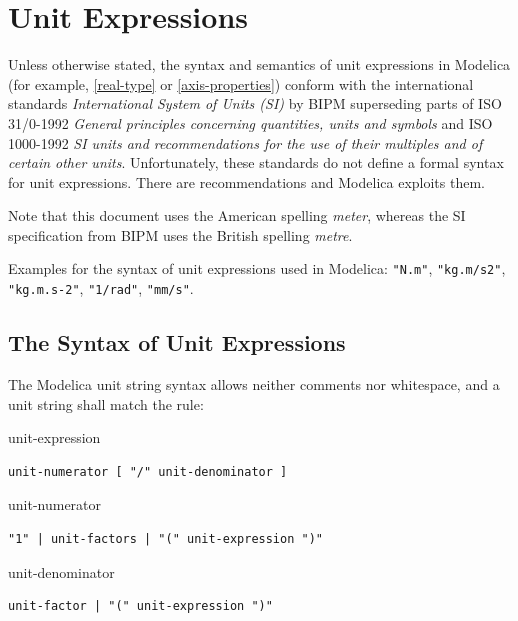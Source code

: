 \chapter{Unit Expressions}\label{unit-expressions}

Unless otherwise stated, the syntax and semantics of unit expressions in Modelica (for example, \cref{real-type} or \cref{axis-properties}) conform with the international standards \emph{International System of Units (SI)} by BIPM superseding parts of ISO 31/0-1992 \emph{General principles concerning quantities, units and symbols} and ISO 1000-1992 \emph{SI units and recommendations for the use of their multiples and of certain other units}.
Unfortunately, these standards do not define a formal syntax for unit expressions.
There are recommendations and Modelica exploits them.

Note that this document uses the American spelling \emph{meter}, whereas the SI specification from BIPM uses the British spelling \emph{metre}.

Examples for the syntax of unit expressions used in Modelica: \lstinline!"N.m"!, \lstinline!"kg.m/s2"!, \lstinline!"kg.m.s-2"!, \lstinline!"1/rad"!, \lstinline!"mm/s"!.

\section{The Syntax of Unit Expressions}\label{the-syntax-of-unit-expressions}

The Modelica unit string syntax allows neither comments nor whitespace, and a unit string shall match the  rule:

\begin{production}{unit-expression}
\begin{lstlisting}
unit-numerator [ "/" unit-denominator ]
\end{lstlisting}
\end{production}

\begin{production}{unit-numerator}
\begin{lstlisting}
"1" | unit-factors | "(" unit-expression ")"
\end{lstlisting}
\end{production}

\begin{production}{unit-denominator}
\begin{lstlisting}
unit-factor | "(" unit-expression ")"
\end{lstlisting}
\end{production}

